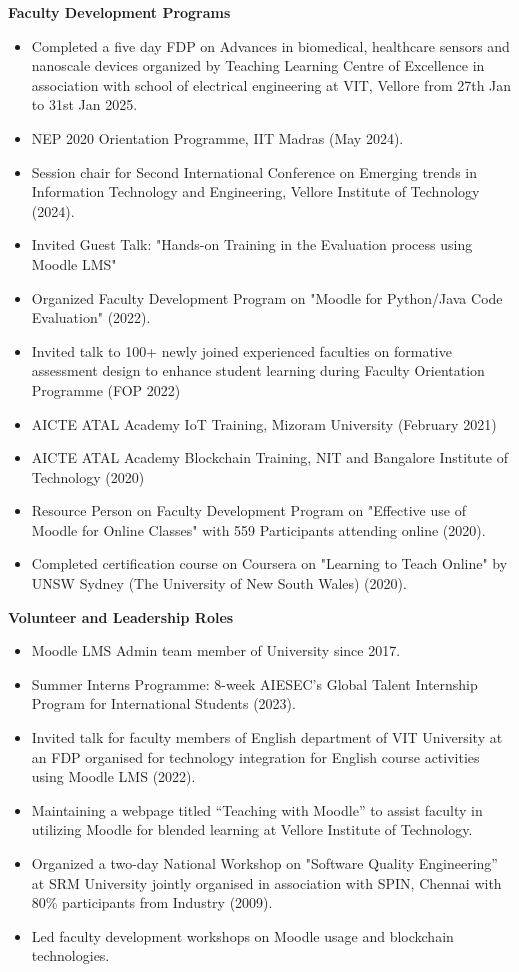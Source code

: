 \documentclass[a4paper,10pt]{article}
\newcommand{\cvsection}[1]{%
    \vspace{2mm}
    \begin{tcolorbox}
        \textbf{\large #1}
    \end{tcolorbox}
    \vspace{-4mm}
}
\begin{document}
\cvsection{Faculty Development Programs}
\begin{itemize}[leftmargin=*]
	\item Completed a five day FDP on Advances in biomedical, healthcare sensors and nanoscale devices organized by Teaching Learning Centre of Excellence in association with school of electrical engineering at VIT, Vellore from 27th Jan to 31st Jan 2025.
    \item NEP 2020 Orientation Programme, IIT Madras (May 2024).
    \item Session chair for Second International Conference on Emerging trends in Information Technology and Engineering, Vellore Institute of Technology (2024).
    \item Invited Guest Talk: "Hands-on Training in the Evaluation process using Moodle LMS"
    \item Organized Faculty Development Program on "Moodle for Python/Java Code Evaluation" (2022).
    \item Invited talk to 100+ newly joined experienced faculties on formative assessment design to enhance student learning during Faculty Orientation Programme (FOP 2022)
    \item AICTE ATAL Academy IoT Training, Mizoram University (February 2021)
    \item AICTE ATAL Academy Blockchain Training, NIT and Bangalore Institute of Technology (2020)
    \item Resource Person on Faculty Development Program on "Effective use of Moodle for Online Classes" with 559 Participants attending online (2020).
    \item Completed certification course on Coursera on "Learning to Teach Online" by UNSW Sydney (The University of New South Wales) (2020).
\end{itemize}

\cvsection{Volunteer and Leadership Roles}
\begin{itemize}[leftmargin=*]
	\item Moodle LMS Admin team member of University since 2017.
	\item Summer Interns Programme: 8-week AIESEC's Global Talent Internship Program for International Students (2023).
	\item Invited talk for faculty members of English department of VIT University at an FDP organised for technology integration for English course activities using Moodle LMS (2022).
	\item Maintaining a webpage titled “Teaching with Moodle” to assist faculty in utilizing Moodle for blended learning at Vellore Institute of Technology. 
    \item Organized a two-day National Workshop on "Software Quality Engineering” at SRM University jointly organised in association with SPIN, Chennai with 80\% participants from Industry (2009).
    \item Led faculty development workshops on Moodle usage and blockchain technologies.
    
\end{itemize}
\end{document}
